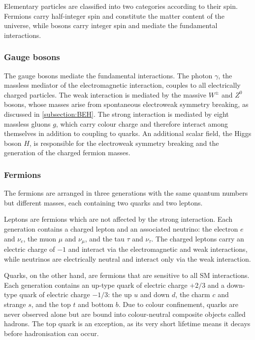 \vspace{0.5 cm}

Elementary particles are classified into two categories according to their spin. Fermions carry half-integer spin and constitute the matter content of the universe, while bosons carry integer spin and mediate the fundamental interactions.

\subsubsection{Gauge bosons}

The gauge bosons mediate the fundamental interactions. The photon $\gamma$, the massless mediator of the electromagnetic interaction, couples to all electrically charged particles. The weak interaction is mediated by the massive $W^\pm$ and $Z^0$ bosons, whose masses arise from spontaneous electroweak symmetry breaking, as discussed in \cref{subsection:BEH}. The strong interaction is mediated by eight massless gluons $g$, which carry colour charge and therefore interact among themselves in addition to coupling to quarks. An additional scalar field, the Higgs boson $H$, is responsible for the electroweak symmetry breaking and the generation of the charged fermion masses. 

\subsubsection{Fermions}

The fermions are arranged in three generations with the same quantum numbers but different masses, each containing two quarks and two leptons.

Leptons are fermions which are not affected by the strong interaction. Each generation contains a charged lepton and an associated neutrino: the electron $e$ and $\nu_e$, the muon $\mu$ and $\nu_\mu$, and the tau $\tau$ and $\nu_\tau$. The charged leptons carry an electric charge of $-1$ and interact via the electromagnetic and weak interactions, while neutrinos are electrically neutral and interact only via the weak interaction. 

Quarks, on the other hand, are fermions that are sensitive to all SM interactions. Each generation contains an up-type quark of electric charge $+2/3$ and a down-type quark of electric charge $-1/3$: the up $u$ and down $d$, the charm $c$ and strange $s$, and the top $t$ and bottom $b$. Due to colour confinement, quarks are never observed alone but are bound into colour-neutral composite objects called hadrons. The top quark is an exception, as its very short lifetime means it decays before hadronisation can occur.

